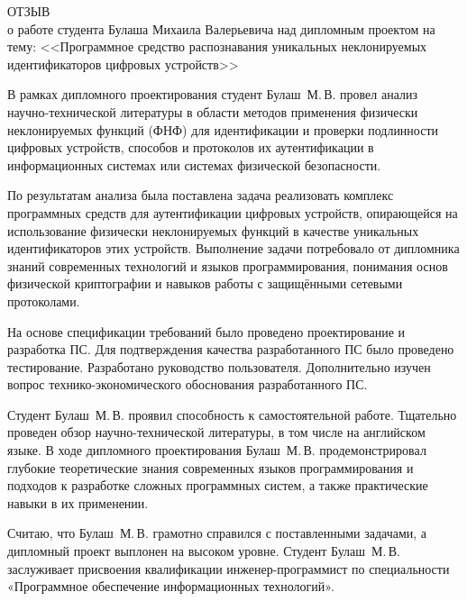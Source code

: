 \thispagestyle{empty}

{
  \begin{center}
    \begin{minipage}{0.8\textwidth}
      \begin{center}
        {\normalsize ОТЗЫВ}\\[1em]
        о работе студента Булаша Михаила Валерьевича
        над дипломным проектом
        на тему:
        <<Программное средство распознавания уникальных неклонируемых идентификаторов цифровых устройств>>
      \end{center}
    \end{minipage}
  \end{center}

В рамках дипломного проектирования студент Булаш~М.\,В. провел анализ научно-технической литературы в области методов применения физически неклонируемых функций (ФНФ) для идентификации и проверки подлинности цифровых устройств, способов и протоколов их аутентификации в информационных системах или системах физической безопасности.

По результатам анализа была поставлена задача реализовать комплекс программных средств для аутентификации цифровых устройств, опирающейся на использование физически неклонируемых функций в качестве уникальных идентификаторов этих устройств. Выполнение задачи потребовало от дипломника знаний современных технологий и языков программирования, понимания основ физической криптографии и навыков работы с защищёнными сетевыми протоколами.

На основе спецификации требований было проведено проектирование и разработка ПС. Для подтверждения качества разработанного ПС было проведено тестирование. Разработано руководство пользователя. Дополнительно изучен вопрос технико-экономического обоснования разработанного ПС.

Студент Булаш~М.\,В. проявил способность к самостоятельной работе. Тщательно проведен обзор научно-технической литературы, в том числе на английском языке. В ходе дипломного проектирования Булаш~М.\,В. продемонстрировал глубокие теоретические знания современных языков программирования и подходов к разработке сложных программных систем, а также практические навыки в их применении.

Считаю, что Булаш~М.\,В. грамотно справился с поставленными задачами, а дипломный проект выплонен на высоком уровне. Студент Булаш~М.\,В. заслуживает присвоения квалификации инженер-программист по специальности «Программное обеспечение информационных технологий».

}
